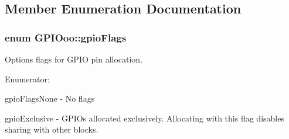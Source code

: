 \subsection{Member Enumeration Documentation}
\hypertarget{class_g_p_i_ooo_a63b72558d40ed7f3ccc0c6f11d1e3b10}{
\subsubsection[{gpio\-Flags}]{\setlength{\rightskip}{0pt plus 5cm}enum {\bf G\-P\-I\-Ooo\-::gpio\-Flags}}}\label{class_g_p_i_ooo_a63b72558d40ed7f3ccc0c6f11d1e3b10}
Options flags for G\-P\-I\-O pin allocation. \begin{Desc}
\item[Enumerator\-: ]\par
\begin{description}
\item[{\em 
\hypertarget{class_g_p_i_ooo_a63b72558d40ed7f3ccc0c6f11d1e3b10aa64ecca268265aa77389ee957e01fd63}{gpio\-Flags\-None}\label{class_g_p_i_ooo_a63b72558d40ed7f3ccc0c6f11d1e3b10aa64ecca268265aa77389ee957e01fd63}
}]gpio\-Flags\-None -\/ No flags \item[{\em 
\hypertarget{class_g_p_i_ooo_a63b72558d40ed7f3ccc0c6f11d1e3b10a42607c5a4f579963b6426f81d2266c62}{gpio\-Exclusive}\label{class_g_p_i_ooo_a63b72558d40ed7f3ccc0c6f11d1e3b10a42607c5a4f579963b6426f81d2266c62}
}]gpio\-Exclusive -\/ G\-P\-I\-Os allocated exclusively. Allocating with this flag disables sharing with other blocks. \end{description}
\end{Desc}

